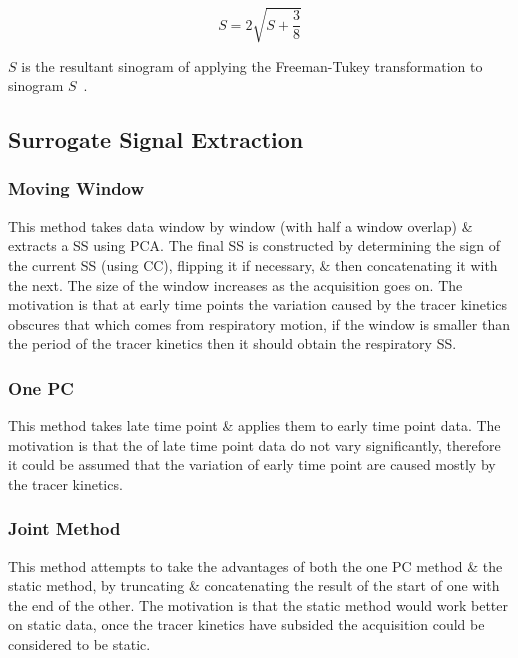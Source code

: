         \begin{equation}
            S = 2 \sqrt{S + \frac{3}{8}}
        \end{equation}
        
        \noindent $S$ is the resultant sinogram of applying the Freeman-Tukey transformation to sinogram $S$~\cite{Freeman1950TransformationsRoot}.
    
    \subsection{Surrogate Signal Extraction} \label{sec:surrogate_signal_extraction}
        \subsubsection{Moving Window} \label{sec:moving_window}
            This method takes data window by window (with half a window overlap) \& extracts a \gls{SS} using \gls{PCA}. The final \gls{SS} is constructed by determining the sign of the current \gls{SS} (using \gls{CC}), flipping it if necessary, \& then concatenating it with the next. The size of the window increases as the acquisition goes on. The motivation is that at early time points the variation caused by the tracer kinetics obscures that which comes from respiratory motion, if the window is smaller than the period of the tracer kinetics then it should obtain the respiratory \gls{SS}.
        
        \subsubsection{One \gls{PC}} \label{sec:one_pc}
            This method takes late time point  \& applies them to early time point data. The motivation is that the  of late time point data do not vary significantly, therefore it could be assumed that the variation of early time point  are caused mostly by the tracer kinetics.
        
        \subsubsection{Joint Method} \label{sec:joint_method}
            This method attempts to take the advantages of both the one \gls{PC} method \& the static method, by truncating \& concatenating the result of the start of one with the end of the other. The motivation is that the static method would work better on static data, once the tracer kinetics have subsided the acquisition could be considered to be static.
    
